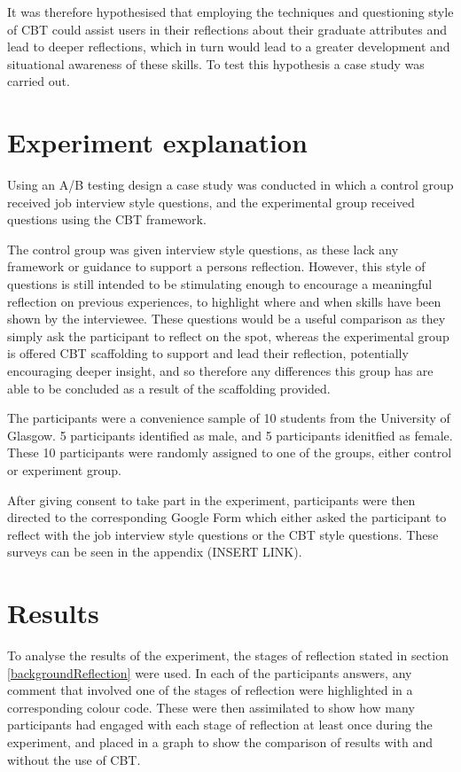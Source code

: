 \documentclass{l4proj}
\begin{document}
It was therefore hypothesised that employing the techniques and questioning style of CBT could assist users in their reflections about their graduate attributes and lead to deeper reflections, which in turn would lead to a greater development and situational awareness of these skills. To test this hypothesis a case study was carried out.

\section{Experiment explanation}

Using an A/B testing design a case study was conducted in which a control group received job interview style questions, and the experimental group received questions using the CBT framework. 

The control group was given interview style questions, as these lack any framework or guidance to support a persons reflection. However, this style of questions is still intended to be stimulating enough to encourage a meaningful reflection on previous experiences, to highlight where and when skills have been shown by the interviewee. These questions would be a useful comparison as they simply ask the participant to reflect on the spot, whereas the experimental group is offered CBT scaffolding to support and lead their reflection, potentially encouraging deeper insight, and so therefore any differences this group has are able to be concluded as a result of the scaffolding provided. 

The participants were a convenience sample of 10 students from the University of Glasgow. 5 participants identified as male, and 5 participants idenitfied as female. These 10 participants were randomly assigned to one of the groups, either control or experiment group.

After giving consent to take part in the experiment, participants were then directed to the corresponding Google Form which either asked the participant to reflect with the job interview style questions or the CBT style questions. These surveys can be seen in the appendix (INSERT LINK).


\section{Results}

To analyse the results of the experiment, the stages of reflection stated in section \ref{backgroundReflection} were used. In each of the participants answers, any comment that involved one of the stages of reflection were highlighted in a corresponding colour code. These were then assimilated to show how many participants had engaged with each stage of reflection at least once during the experiment, and placed in a graph to show the comparison of results with and without the use of CBT.
\end{document}
